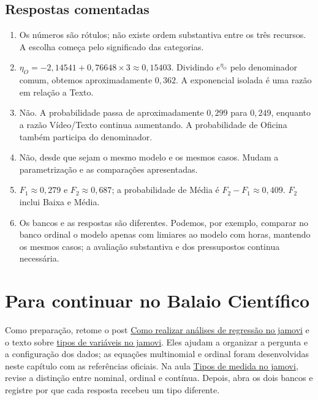 \subsection{Respostas comentadas}
\begin{enumerate}
\item Os números são rótulos; não existe ordem substantiva entre os três recursos. A escolha começa pelo significado das categorias.
\item $\eta_O=-2{,}14541+0{,}76648\times3\approx0{,}15403$. Dividindo $e^{\eta_O}$ pelo denominador comum, obtemos aproximadamente $0{,}362$. A exponencial isolada é uma razão em relação a Texto.
\item Não. A probabilidade passa de aproximadamente $0{,}299$ para $0{,}249$, enquanto a razão Vídeo/Texto continua aumentando. A probabilidade de Oficina também participa do denominador.
\item Não, desde que sejam o mesmo modelo e os mesmos casos. Mudam a parametrização e as comparações apresentadas.
\item $F_1\approx0{,}279$ e $F_2\approx0{,}687$; a probabilidade de Média é $F_2-F_1\approx0{,}409$. $F_2$ inclui Baixa e Média.
\item Os bancos e as respostas são diferentes. Podemos, por exemplo, comparar no banco ordinal o modelo apenas com limiares ao modelo com horas, mantendo os mesmos casos; a avaliação substantiva e dos pressupostos continua necessária.
\end{enumerate}

\section{Para continuar no Balaio Científico}

Como preparação, retome o post \href{https://www.balaiocientifico.com/2024/07/como-realizar-analises-de-regressao-no.html}{Como realizar análises de regressão no jamovi} e o texto sobre \href{https://www.balaiocientifico.com/2026/10/tipos-de-variaveis-no-jamovi-nominal.html}{tipos de variáveis no jamovi}. Eles ajudam a organizar a pergunta e a configuração dos dados; as equações multinomial e ordinal foram desenvolvidas neste capítulo com as referências oficiais. Na aula \href{https://www.youtube.com/watch?v=398uFqX7NRA}{Tipos de medida no jamovi}, revise a distinção entre nominal, ordinal e contínua. Depois, abra os dois bancos e registre por que cada resposta recebeu um tipo diferente.
